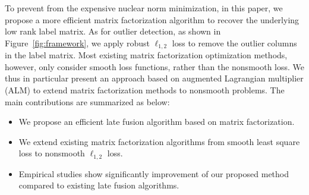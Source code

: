 \documentclass[letterpaper]{article}
\def\bL{{\bf L}}
\def\bU{{\bf U}}
\def\bV{{\bf V}}
\def\dsR{\mathds{R}}
\def\bX{{\bf X}}
\def\bX{{\bf X}}
\def\st{{\text{s.t.}}}
\def\rank{{\text{rank}}}
\begin{document}


To prevent from the expensive nuclear norm minimization, in this paper, we propose a more efficient matrix factorization algorithm to recover the underlying low rank label matrix.
As for outlier detection, as shown in Figure~\ref{fig:framework}, we apply robust $\ell_{1,2}$ loss to remove the outlier columns in the label matrix.
Most existing matrix factorization optimization methods, however, only consider smooth loss functions, rather than the nonsmooth loss.
We thus in particular present an approach based on augmented Lagrangian multiplier (ALM) to extend matrix factorization methods to nonsmooth problems.
The main contributions are summarized as below:
\begin{itemize}
  \item We propose an efficient late fusion algorithm based on matrix factorization.
  \item We extend existing matrix factorization algorithms from smooth least square loss to nonsmooth $\ell_{1,2}$ loss.
  \item Empirical studies show significantly improvement of our proposed method compared to existing late fusion algorithms.
\end{itemize}
\end{document}
